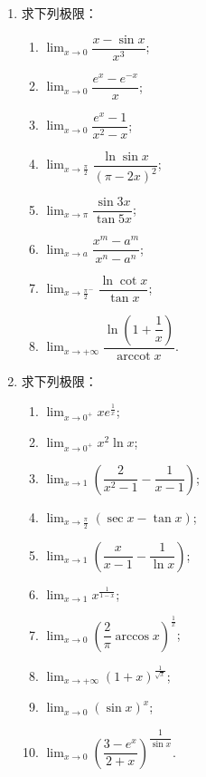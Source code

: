 \begin{enumerate}\setlength{\itemsep}{7pt}
    \item 求下列极限：
    \begin{enumerate}[(1)]\setlength{\itemsep}{5pt}\setlength{\topsep}{15pt}
        \item $\displaystyle\lim_{x\to0}\dfrac{x-\sin x}{x^3}$;
        \item $\displaystyle\lim_{x\to0}\dfrac{e^{x}-e^{-x}}{x}$;
        \item $\displaystyle\lim_{x\to0}\dfrac{e^x-1}{x^2-x}$;
        \item $\displaystyle\lim_{x\to\frac{\pi}{2}}\dfrac{\ln \sin x}{(\pi-2x)^2}$;
        \item $\displaystyle\lim_{x\to\pi}\dfrac{\sin 3x}{\tan 5x}$;
        \item $\displaystyle\lim_{x\to a}\dfrac{x^m-a^m}{x^n-a^n}$;
        \item $\displaystyle\lim_{x\to\frac{\pi}{2}^{-}}\dfrac{\ln\cot x}{\tan x}$;
        \item $\displaystyle\lim_{x\to+\infty}\dfrac{\ln\left(1+\dfrac{1}{x}\right)}{\text{arccot}\; x}$.
    \end{enumerate}

    \item 求下列极限：
    \begin{enumerate}[(1)]\setlength{\itemsep}{5pt}\setlength{\topsep}{15pt}
        \item $\displaystyle\lim_{x\to0^+}xe^{\frac{1}{x}}$;
        \item $\displaystyle\lim_{x\to0^+}x^2\ln x$;
        \item $\displaystyle\lim_{x\to1}\left(\dfrac{2}{x^2-1}-\dfrac{1}{x-1}\right)$;
        \item $\displaystyle\lim_{x\to\frac{\pi}{2}}(\sec x-\tan x)$;
        \item $\displaystyle\lim_{x\to1}\left(\dfrac{x}{x-1}-\dfrac{1}{\ln x}\right)$;
        \item $\displaystyle\lim_{x\to1}x^{\frac{1}{1-x}}$;
        \item $\displaystyle\lim_{x\to0}\left(\dfrac{2}{\pi}\arccos x\right)^{\frac{1}{x}}$;
        \item $\displaystyle\lim_{x\to+\infty}(1+x)^{\frac{1}{\sqrt{x}}}$;
        \item $\displaystyle\lim_{x\to0}(\sin x)^x$;
        \item $\displaystyle\lim_{x\to0}\left(\dfrac{3-e^x}{2+x}\right)^{\dfrac{1}{\sin x}}$.
    \end{enumerate}


\end{enumerate}
